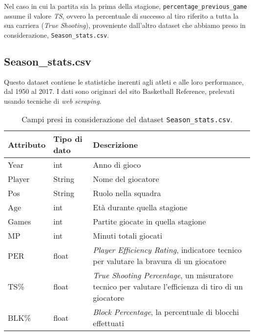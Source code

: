 \begin{code}
\inputminted[breaklines]{python}{../datasets/shot_logs_nv.py}
\end{code}

Nel caso in cui la partita sia la prima della stagione, \texttt{percentage\_previous\_game} assume il valore \textit{TS}, ovvero la percentuale di successo al tiro riferito a tutta la sua carriera (\textit{True Shooting}), proveniente dall’altro dataset che abbiamo preso in considerazione, \texttt{Season\_stats.csv}.

\subsection{Season\_stats.csv}

Questo dataset contiene le statistiche inerenti agli atleti e alle loro performance, dal 1950 al 2017. I dati sono originari del sito Basketball Reference, prelevati usando tecniche di \textit{web scraping}.

\begin{center}
	\begin{longtable}[m]{|m{5em} m{7em} m{16em}|} 

		\caption{Campi presi in considerazione del dataset \texttt{Season\_stats.csv}.\label{long}}\\
		\hline
		\bfseries{Attributo} & \bfseries{Tipo di dato} & \bfseries{Descrizione} \\
		\hline

		Year & int & Anno di gioco\\ 
		\hline
		Player & String & Nome del giocatore\\ 
		\hline
		Pos & String & Ruolo nella squadra\\ 
		\hline
		Age & int & Età durante quella stagione\\ 
		\hline
		Games & int & Partite giocate in quella stagione\\ 
		\hline
		MP & int & Minuti totali giocati\\ 
		\hline
		PER & float & \textit{Player Efficiency Rating}, indicatore tecnico per valutare la bravura di un giocatore \\ 
		\hline
		TS\% & float & \textit{True Shooting Percentage}, un misuratore tecnico per valutare l’efficienza di tiro di un giocatore  \\ 
		\hline
		BLK\% & float & \textit{Block Percentage}, la percentuale di blocchi effettuati \\ 
		\hline

	\end{longtable}
\end{center}

